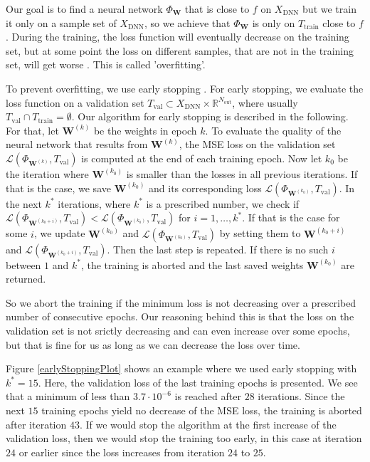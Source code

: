Our goal is to find a neural network $\Phi_\mathbf{W}$ that is close to $f$ on $X_\mathrm{DNN}$ but we train it only on a sample set of $X_\mathrm{DNN}$, so we achieve that $\Phi_\mathbf{W}$ is only on $T_\mathrm{train}$ close to $f$. During the training, the loss function will eventually decrease on the training set, but at some point the loss on different samples, that are not in the training set, will get worse \cite{Prechelt2012}. This is called 'overfitting'.

To prevent overfitting, we use early stopping \cite{Prechelt2012}. For early stopping, we evaluate the loss function on a validation set $T_\mathrm{val}\subset X_\mathrm{DNN}\times\mathbb{R}^{N_\mathrm{out}}$, where usually $T_\mathrm{val}\cap T_\mathrm{train}=\emptyset$. Our algorithm for early stopping is described in the following.\\

For that, let $\mathbf{W}^{(k)}$ be the weights in epoch $k$. To evaluate the quality of the neural network that results from $\mathbf{W}^{(k)}$, the MSE loss on the validation set $\mathscr{L}(\Phi_{\mathbf{W}^{(k)}},T_\mathrm{val})$ is computed at the end of each training epoch. Now let $k_0$ be the iteration where $\mathbf{W}^{(k_0)}$ is smaller than the losses in all previous iterations. If that is the case, we save $\mathbf{W}^{(k_0)}$ and its corresponding loss $\mathscr{L}(\Phi_{\mathbf{W}^{(k_0)}},T_\mathrm{val})$. In the next $k^*$ iterations, where $k^*$ is a prescribed number, we check if $\mathscr{L}(\Phi_{\mathbf{W}^{(k_0+i)}},T_\mathrm{val})<\mathscr{L}(\Phi_{\mathbf{W}^{(k_0)}},T_\mathrm{val})$ for $i=1,\dotsc,k^*$. If that is the case for some $i$, we update $\mathbf{W}^{(k_0)}$ and $\mathscr{L}(\Phi_{\mathbf{W}^{(k_0)}},T_\mathrm{val})$ by setting them to $\mathbf{W}^{(k_0+i)}$ and $\mathscr{L}(\Phi_{\mathbf{W}^{(k_0+i)}},T_\mathrm{val})$. Then the last step is repeated. If there is no such $i$ between $1$ and $k^*$, the training is aborted and the last saved weights $\mathbf{W}^{(k_0)}$ are returned.

So we abort the training if the minimum loss is not decreasing over a prescribed number of consecutive epochs. Our reasoning behind this is that the loss on the validation set is not srictly decreasing and can even increase over some epochs, but that is fine for us as long as we can decrease the loss over time.

Figure \ref{earlyStoppingPlot} shows an example where we used early stopping with $k^*=15$. Here, the validation loss of the last training epochs is presented. We see that a minimum of less than $3.7\cdot10^{-6}$ is reached after $28$ iterations. Since the next $15$ training epochs yield no decrease of the MSE loss, the training is aborted after iteration $43$. If we would stop the algorithm at the first increase of the validation loss, then we would stop the training too early, in this case at iteration $24$ or earlier since the loss increases from iteration $24$ to $25$.\\

